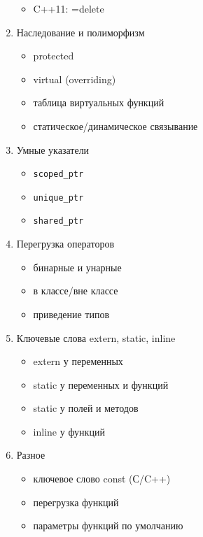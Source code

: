 \begin{enumerate}[noitemsep]
\begin{itemize}[noitemsep]
    \item C++11: =delete
\end{itemize}
\item{Наследование и полиморфизм}
\begin{itemize}[noitemsep]
    \item protected
    \item virtual (overriding)
    \item таблица виртуальных функций
    \item статическое/динамическое связывание
\end{itemize}
\item{Умные указатели}
\begin{itemize}[noitemsep]
    \item \begin{verbatim}scoped_ptr \end{verbatim}
    \item \begin{verbatim}unique_ptr \end{verbatim}
    \item \begin{verbatim}shared_ptr \end{verbatim}
\end{itemize}
\item{Перегрузка операторов}
\begin{itemize}[noitemsep]
    \item бинарные и унарные
    \item в классе/вне классе
    \item приведение типов
\end{itemize}
\item{Ключевые слова extern, static, inline}
\begin{itemize}[noitemsep]
    \item extern у переменных
    \item static у переменных и функций
    \item static у полей и методов
    \item inline у функций
\end{itemize}
\item{Разное}
\begin{itemize}[noitemsep]
    \item ключевое слово const (С/C++)
    \item перегрузка функций
    \item параметры функций по умолчанию
\end{itemize}

\end{enumerate}

